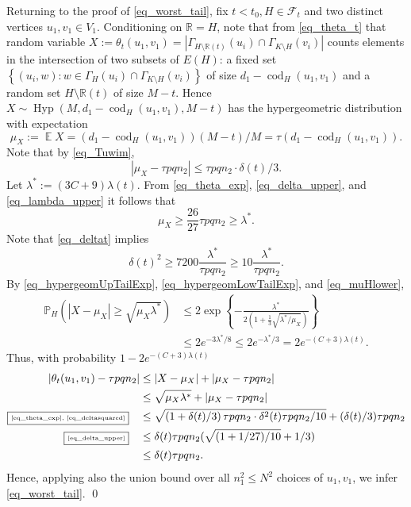 \documentclass[12pt,reqno]{amsart}
\newcommand{\E}{\operatorname{\mathbb{E}}}
\newcommand{\fc}{{\mathcal{F}}}
\newcommand{\Prob} {\mathbb {P}}
\newcommand{\probH}[1]{\Prob_H\left(#1\right)}
\newcommand{\R} {\mathbb R}
\newcommand{\Hyp}{\operatorname{Hyp}}
\newcommand{\cod}{\operatorname{cod}}
\theoremstyle{definition}
\newcommand{\deltat}{\delta(t)}
\newcommand{\justify}[1]{\fbox{\tiny{#1}}\quad}
\begin{document}
	\smallskip
	Returning to the proof of \eqref{eq_worst_tail}, fix $t < t_0, H \in \fc_t$ and two distinct vertices $u_1,v_1\in V_1$. Conditioning on $\R = H$, note that from \eqref{eq_theta_t} that random variable $X := \theta_t(u_1,v_1) = |\Gamma_{H \setminus \R(t)}(u_i)\cap\Gamma_{K\setminus H}(v_i)|$ counts elements in the intersection of two subsets of $E(H)$: a fixed set
	$  \left\{ (u_i,w) : w \in \Gamma_H(u_i) \cap \Gamma_{K \setminus H}(v_i) \right\}$ of size $d_1 - \cod_H(u_1, v_1)$
 and a random set $H \setminus \R(t)$ of size $M - t$. Hence $X \sim \Hyp(M, d_1 - \cod_H(u_1,v_1), M -t)$ has the hypergeometric distribution with expectation
\begin{equation*}
	\mu_X := \E X = (d_1 - \cod_H(u_1,v_1))(M - t)/M  = \tau (d_1 - \cod_H(u_1,v_1)).
\end{equation*}
Note that by \eqref{eq_Tuwim},
\begin{equation}
  \label{eq_theta_exp}
|\mu_X - \tau p q n_2| \le \tau pqn_2 \cdot \deltat/3.
\end{equation}
Let $\lambda^* := (3C + 9)\lambda(t)$. From \eqref{eq_theta_exp},  \eqref{eq_delta_upper}, and \eqref{eq_lambda_upper} it follows that
\begin{equation}
  \label{eq_muHlower}
	\mu_X \ge \frac{26}{27}\tau pqn_{2} \ge \lambda^*.
\end{equation}
Note that \eqref{eq_deltat} implies
  \begin{equation}
    \label{eq_deltasquared}
  \delta(t)^2\ge7200\frac{\lambda^*}{\tau pqn_2}\ge 10\frac{\lambda^*}{\tau pqn_2}.
  \end{equation}
By \eqref{eq_hypergeomUpTailExp}, \eqref{eq_hypergeomLowTailExp}, and \eqref{eq_muHlower},
\begin{equation*}
  \begin{split}
    \probH{|X - \mu_X| \ge \sqrt{\mu_X \lambda^*} } &\le 2 \exp \left\{ - \frac{\lambda^*}{2\left(1  + \frac{1}{3}\sqrt{\lambda^*/\mu_X } \right)} \right\} \\
    &\le 2 e^{-3\lambda^*/8}\le 2 e^{-\lambda^*/3} = 2e^{-(C + 3)\lambda(t)}.
  \end{split}
\end{equation*}
Thus, with probability $1 - 2e^{-(C+3)\lambda(t)}$
\begin{align*}
  |\theta_t(u_1,v_1) - \tau p q n_2| &\le |X - \mu_X| + |\mu_X - \tau p q n_2| \\
  &\le \sqrt{\mu_X \lambda^*} + |\mu_X - \tau p q n_2| \\
  \justify{\eqref{eq_theta_exp}, \eqref{eq_deltasquared}} &\le \sqrt{\left( 1 + \delta(t)/3 \right)\tau p q n_2 \cdot \delta^2(t)\tau p q n_2 / 10} + (\delta(t)/3) \tau p q n_2\\
  \justify{\eqref{eq_delta_upper}} &\le \delta(t)\tau pqn_2 (\sqrt{(1 + 1/27)/10} + 1/3) \\
  &\le \delta(t)\tau pqn_2.
\end{align*}
Hence, applying also the union bound over all $n_1^2 \le N^2$ choices of $u_1,v_1$,  we infer \eqref{eq_worst_tail}.
\qed
\end{document}
